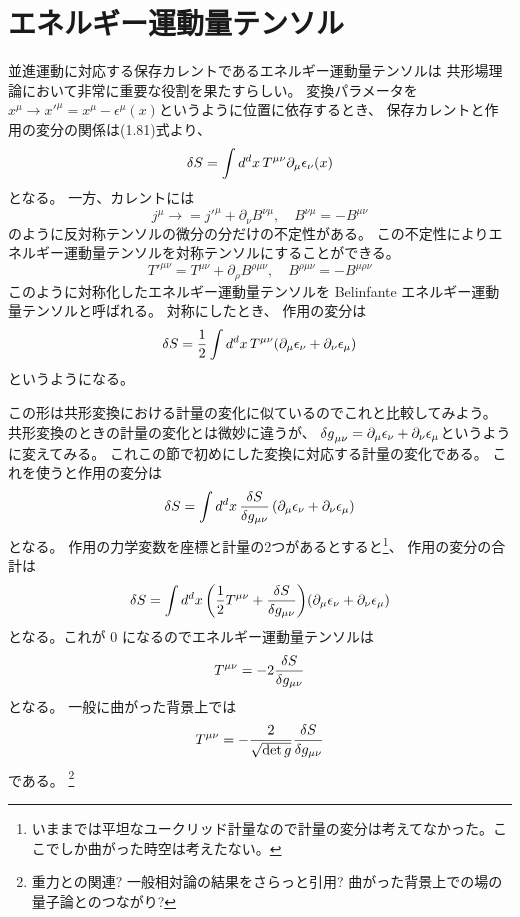 \documentclass[../../master.tex]{subfiles}
\begin{document}
\section{エネルギー運動量テンソル}
並進運動に対応する保存カレントであるエネルギー運動量テンソルは
共形場理論において非常に重要な役割を果たすらしい。
変換パラメータを\(x^\mu\rightarrow x'^\mu = x^\mu -\epsilon^\mu(x)\)というように位置に依存するとき、
保存カレントと作用の変分の関係は(1.81)式より、
\begin{equation}
    \var{S} = \int d^dx\,T^{\mu\nu}\partial_\mu \epsilon_\nu(x)
\end{equation}
となる。
一方、カレントには
\begin{equation}
    j^\mu \rightarrow = j'^\mu + \partial_\nu B^{\nu\mu}, \quad B^{\nu\mu} = -B^{\mu\nu}
\end{equation}
のように反対称テンソルの微分の分だけの不定性がある。
この不定性によりエネルギー運動量テンソルを対称テンソルにすることができる。
\begin{equation*}
    T'^{\mu\nu} = T^{\mu\nu} + \partial_\rho B^{\rho\mu\nu},\quad B^{\rho\mu\nu} =- B^{\mu\rho\nu}
\end{equation*}
このように対称化したエネルギー運動量テンソルを Belinfante エネルギー運動量テンソルと呼ばれる。
対称にしたとき、
作用の変分は
\begin{equation}
    \var{S} = \frac{1}{2}\int d^dx\,T^{\mu\nu} (\partial_\mu \epsilon_\nu + \partial_\nu \epsilon_\mu)
\end{equation}
というようになる。

この形は共形変換における計量の変化に似ているのでこれと比較してみよう。
共形変換のときの計量の変化とは微妙に違うが、
\(\var{g}_{\mu\nu}=\partial_\mu\epsilon_\nu+\partial_\nu\epsilon_\mu\)というように変えてみる。
これこの節で初めにした変換に対応する計量の変化である。
これを使うと作用の変分は
\begin{equation}
    \var{S} = \int d^dx\, \fdv{S}{g_{\mu\nu}}\,(\partial_\mu\epsilon_\nu+\partial_\nu\epsilon_\mu)
\end{equation}
となる。
作用の力学変数を座標と計量の2つがあるとすると\footnote{いままでは平坦なユークリッド計量なので計量の変分は考えてなかった。ここでしか曲がった時空は考えたない。}、
作用の変分の合計は
\begin{equation*}
    \var{S} = \int d^dx\,\qty(\frac{1}{2}T^{\mu\nu} + \fdv{S}{g_{\mu\nu}})(\partial_\mu\epsilon_\nu+\partial_\nu\epsilon_\mu)
\end{equation*}
となる。これが 0 になるのでエネルギー運動量テンソルは
\begin{equation}
    T^{\mu\nu} = -2 \fdv{S}{g_{\mu\nu}}
\end{equation}
となる。
一般に曲がった背景上では
\begin{equation}
    T^{\mu\nu} = -\frac{2}{\sqrt{\det g}}\fdv{S}{g_{\mu\nu}}
\end{equation}
である。
\footnote{重力との関連? 一般相対論の結果をさらっと引用? 曲がった背景上での場の量子論とのつながり?}
\end{document}
